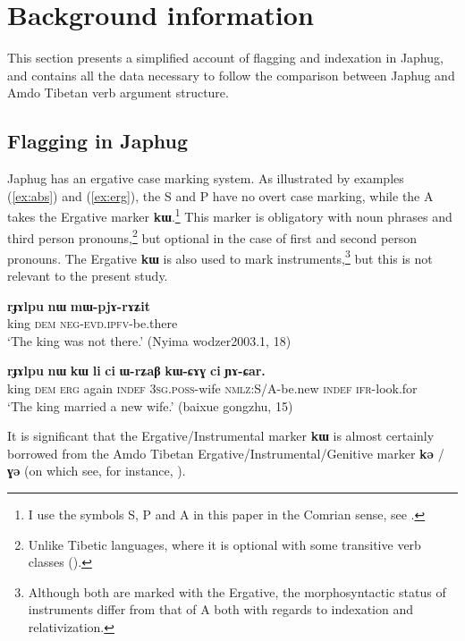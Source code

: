 \documentclass[oneside,a4paper,11pt]{article}
\newcommand{\ipa}[1]{{\phon\textbf{\mbox{#1}}}} %
\newcommand{\refb}[1]{(\ref{#1})}
\begin{document}
\section{Background information}
This section presents a simplified account of flagging and indexation in Japhug, and contains all the data necessary to follow the comparison between Japhug and Amdo Tibetan verb argument structure.

\subsection{Flagging in Japhug}
Japhug has an ergative case marking system. As illustrated by examples \refb{ex:abs} and \refb{ex:erg}, the S and P have no overt case marking, while the A takes the Ergative marker \ipa{kɯ}.\footnote{I use the symbols S, P and A in this paper in the Comrian sense, see \citet{haspelmath11SAPTR}.} This marker is obligatory with noun phrases and third person pronouns,\footnote{Unlike Tibetic languages, where it is optional with some transitive verb classes (\citealt{tournadre91}).} but optional in the case of first and second person pronouns.  The Ergative \ipa{kɯ} is also used to mark instruments,\footnote{Although both are marked with the Ergative, the morphosyntactic status of instruments differ from that of A both with regards to indexation and relativization.} but this is not relevant to the present study.

 \begin{exe}
\ex \label{ex:abs}
\gll
\ipa{rɟɤlpu}  	\ipa{nɯ}  	\ipa{mɯ-pjɤ-rɤʑit}  \\
king \textsc{dem} \textsc{neg-evd.ipfv}-be.there \\
 \glt `The king was not there.' (Nyima wodzer2003.1, 18)
\end{exe}

 \begin{exe}
\ex \label{ex:erg}
\gll 
\ipa{rɟɤlpu}  	\ipa{nɯ}  	\ipa{kɯ}  	\ipa{li}  	\ipa{ci}  	\ipa{ɯ-rʑaβ}  	\ipa{kɯ-ɕɤɣ}  	\ipa{ci}  	\ipa{ɲɤ-ɕar.}  	 \\
king \textsc{dem} \textsc{erg} again \textsc{indef} \textsc{3sg.poss}-wife \textsc{nmlz}:S/A-be.new \textsc{indef}  \textsc{ifr}-look.for \\
\glt `The king married a new wife.' (baixue gongzhu, 15)
\end{exe}

It is significant that the Ergative/Instrumental marker \ipa{kɯ} is almost certainly borrowed from the Amdo Tibetan Ergative/Instrumental/Genitive marker \ipa{kə} / \ipa{ɣə} (on which see, for instance, \citealt[62]{haller04themchen}).
\end{document}
